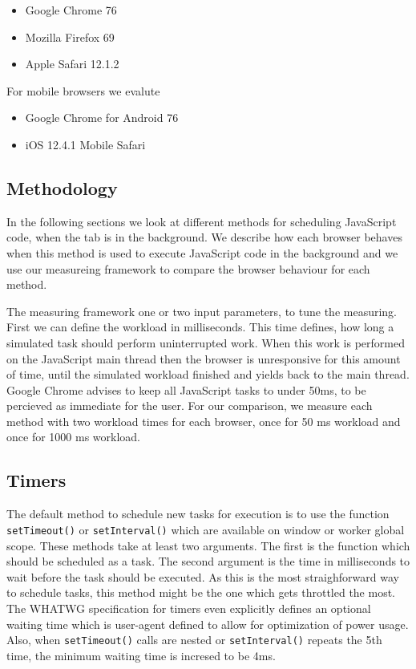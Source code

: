 \documentclass[article,type=bsc,colorback,accentcolor=tud9c]{tudthesis}
\begin{document}
  \begin{itemize}
  \item Google Chrome 76
  \item Mozilla Firefox 69
  \item Apple Safari 12.1.2
  \end{itemize}

  For mobile browsers we evalute

  \begin{itemize}
  \item Google Chrome for Android 76
  \item iOS 12.4.1 Mobile Safari
  \end{itemize}

  
  
  \subsection{Methodology}

  In the following sections we look at different methods for scheduling JavaScript code, when the tab is in the background. We describe how each browser behaves when this method is used to execute JavaScript code in the background and we use our measureing framework to compare the browser behaviour for each method.

  The measuring framework one or two input parameters, to tune the measuring. First we can define the workload in milliseconds. This time defines, how long a simulated task should perform uninterrupted work. When this work is performed on the JavaScript main thread then the browser is unresponsive for this amount of time, until the simulated workload finished and yields back to the main thread. Google Chrome advises to keep all JavaScript tasks to under 50ms, to be percieved as immediate for the user\cite{chrome-rail-model}. For our comparison, we measure each method with two workload times for each browser, once for 50 ms workload and once for 1000 ms workload.

  
  \subsection{Timers}

  The default method to schedule new tasks for execution is to use the function \texttt{setTimeout()} or \texttt{setInterval()} which are available on window or worker global scope. These methods take at least two arguments. The first is the function which should be scheduled as a task. The second argument is the time in milliseconds to wait before the task should be executed. As this is the most straighforward way to schedule tasks, this method might be the one which gets throttled the most. The WHATWG specification for timers\cite{whatwg-timers} even explicitly defines an optional waiting time which is user-agent defined to allow for optimization of power usage. Also, when \texttt{setTimeout()} calls are nested or \texttt{setInterval()} repeats the 5th time, the minimum waiting time is incresed to be 4ms.
\end{document}
